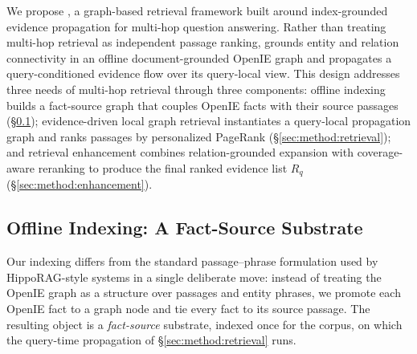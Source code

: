 We propose \methodname{}, a graph-based retrieval framework built around
index-grounded evidence propagation for multi-hop question answering.
Rather than treating multi-hop retrieval as independent passage ranking,
\methodname{} grounds entity and relation connectivity in an offline
document-grounded OpenIE graph and propagates a query-conditioned
evidence flow over its query-local view. This design addresses three
needs of multi-hop retrieval through three components: offline indexing
builds a fact-source graph that couples OpenIE facts with their source
passages (\S\ref{sec:method:substrate}); evidence-driven
local graph retrieval instantiates a query-local propagation graph and
ranks passages by personalized PageRank (\S\ref{sec:method:retrieval});
and retrieval enhancement combines relation-grounded expansion with
coverage-aware reranking to produce the final ranked evidence list
$R_q$ (\S\ref{sec:method:enhancement}).

\subsection{Offline Indexing: A Fact-Source Substrate}
\label{sec:method:substrate}

Our indexing differs from the standard passage--phrase formulation used
by HippoRAG-style systems in a single deliberate move: instead of
treating the OpenIE graph as a structure over passages and entity
phrases, we promote each OpenIE fact to a graph node and tie every
fact to its source passage. The resulting object is a
\emph{fact-source} substrate, indexed once for the corpus, on which
the query-time propagation of \S\ref{sec:method:retrieval} runs.

